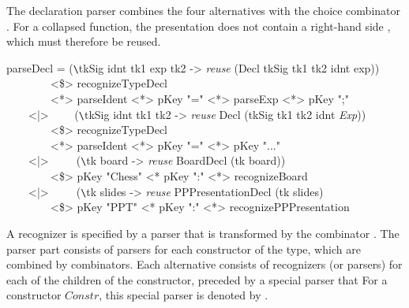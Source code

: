 The declaration parser combines the four alternatives with the choice combinator \p{<|>}. For a collapsed function, the presentation does not contain a right-hand side , which must therefore be reused. 

\ttfamily \begin{small} \begin{tabbing}
parseDecl = (\verb|\|tkSig idnt tk1 exp tk2 -> {\em reuse} (Decl tkSig tk1 tk2 idnt exp))\\
~~~~~~~~<\$> recognizeTypeDecl\\
~~~~~~~~<*> parseIdent <*> pKey "=" <*> parseExp <*> pKey ";"\\
~~~~<|>~~~~ (\verb|\|tkSig idnt tk1 tk2 -> {\em reuse} Decl (tkSig tk1 tk2 idnt {\em Exp}))\\
~~~~~~~~<\$> recognizeTypeDecl\\
~~~~~~~~<*> parseIdent <*> pKey "=" <*> pKey "..."\\
~~~~<|>~~~~~(\verb|\|tk board -> {\em reuse} BoardDecl (tk board))\\
~~~~~~~~<\$> pKey "Chess" <* pKey ":" <*> recognizeBoard\\
~~~~<|>~~~~~(\verb|\|tk slides -> {\em reuse} PPPresentationDecl (tk slides)\\
~~~~~~~~<\$> pKey "PPT" <* pKey ":" <*> recognizePPPresentation
\end{tabbing} \end{small} \rmfamily
{}






A recognizer is specified by a parser that is transformed by the combinator . The parser part consists of parsers for each constructor of the type, which are combined by \p{<|>} combinators. Each alternative consists of recognizers (or parsers) for each of the children of the constructor, preceded by a special parser that  For a constructor $Constr$, this special parser is denoted by  .

